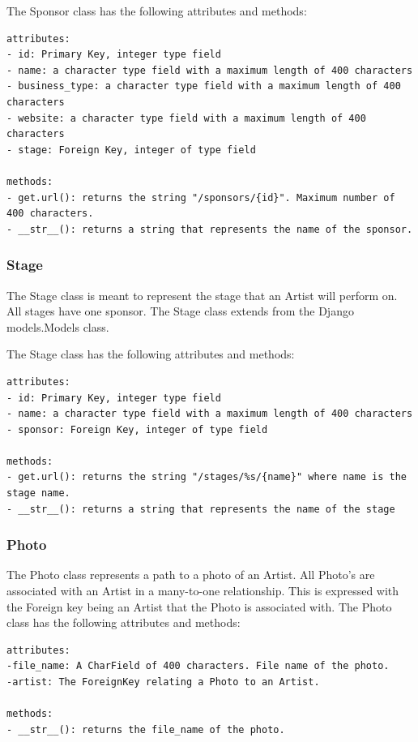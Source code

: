 \documentclass[12pt,english]{scrartcl}
\begin{document}
The Sponsor class has the following attributes and methods:
\begin{verbatim}
attributes:
- id: Primary Key, integer type field
- name: a character type field with a maximum length of 400 characters
- business_type: a character type field with a maximum length of 400 characters
- website: a character type field with a maximum length of 400 characters
- stage: Foreign Key, integer of type field

methods:
- get.url(): returns the string "/sponsors/{id}". Maximum number of 400 characters.
- __str__(): returns a string that represents the name of the sponsor.
\end{verbatim}

\subsubsection{Stage}
The Stage class is meant to represent the stage that an Artist will perform on. All stages
have one sponsor. The Stage class extends from the Django models.Models class.

The Stage class has the following attributes and methods:
\begin{verbatim}
attributes:
- id: Primary Key, integer type field
- name: a character type field with a maximum length of 400 characters
- sponsor: Foreign Key, integer of type field

methods:
- get.url(): returns the string "/stages/%s/{name}" where name is the stage name.
- __str__(): returns a string that represents the name of the stage
\end{verbatim}

\subsubsection{Photo}
The Photo class represents a path to a photo of an Artist. 
All Photo's are associated with an Artist in a many-to-one relationship.
This is expressed with the Foreign key being an Artist that the Photo is associated with. 
The Photo class has the following attributes and methods:
\begin{verbatim}
attributes:
-file_name: A CharField of 400 characters. File name of the photo. 
-artist: The ForeignKey relating a Photo to an Artist.

methods:
- __str__(): returns the file_name of the photo.
\end{verbatim}
\end{document}
